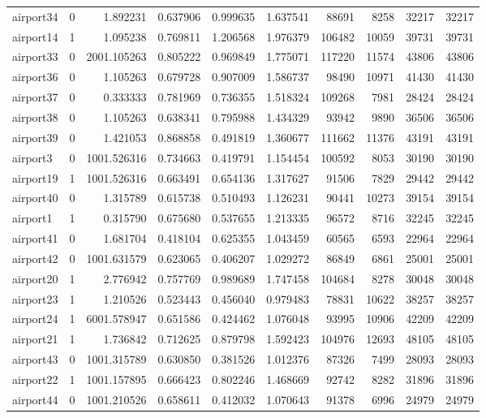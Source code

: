 \begin{longtable}{|l|r|r|r|r|r|r|r|r|r|}
airport34 & 0 & 1.892231 & 0.637906 & 0.999635 & 1.637541 & 88691 & 8258 & 32217 & 32217 \\
airport14 & 1 & 1.095238 & 0.769811 & 1.206568 & 1.976379 & 106482 & 10059 & 39731 & 39731 \\
airport33 & 0 & 2001.105263 & 0.805222 & 0.969849 & 1.775071 & 117220 & 11574 & 43806 & 43806 \\
airport36 & 0 & 1.105263 & 0.679728 & 0.907009 & 1.586737 & 98490 & 10971 & 41430 & 41430 \\
airport37 & 0 & 0.333333 & 0.781969 & 0.736355 & 1.518324 & 109268 & 7981 & 28424 & 28424 \\
airport38 & 0 & 1.105263 & 0.638341 & 0.795988 & 1.434329 & 93942 & 9890 & 36506 & 36506 \\
airport39 & 0 & 1.421053 & 0.868858 & 0.491819 & 1.360677 & 111662 & 11376 & 43191 & 43191 \\
airport3 & 0 & 1001.526316 & 0.734663 & 0.419791 & 1.154454 & 100592 & 8053 & 30190 & 30190 \\
airport19 & 1 & 1001.526316 & 0.663491 & 0.654136 & 1.317627 & 91506 & 7829 & 29442 & 29442 \\
airport40 & 0 & 1.315789 & 0.615738 & 0.510493 & 1.126231 & 90441 & 10273 & 39154 & 39154 \\
airport1 & 1 & 0.315790 & 0.675680 & 0.537655 & 1.213335 & 96572 & 8716 & 32245 & 32245 \\
airport41 & 0 & 1.681704 & 0.418104 & 0.625355 & 1.043459 & 60565 & 6593 & 22964 & 22964 \\
airport42 & 0 & 1001.631579 & 0.623065 & 0.406207 & 1.029272 & 86849 & 6861 & 25001 & 25001 \\
airport20 & 1 & 2.776942 & 0.757769 & 0.989689 & 1.747458 & 104684 & 8278 & 30048 & 30048 \\
airport23 & 1 & 1.210526 & 0.523443 & 0.456040 & 0.979483 & 78831 & 10622 & 38257 & 38257 \\
airport24 & 1 & 6001.578947 & 0.651586 & 0.424462 & 1.076048 & 93995 & 10906 & 42209 & 42209 \\
airport21 & 1 & 1.736842 & 0.712625 & 0.879798 & 1.592423 & 104976 & 12693 & 48105 & 48105 \\
airport43 & 0 & 1001.315789 & 0.630850 & 0.381526 & 1.012376 & 87326 & 7499 & 28093 & 28093 \\
airport22 & 1 & 1001.157895 & 0.666423 & 0.802246 & 1.468669 & 92742 & 8282 & 31896 & 31896 \\
airport44 & 0 & 1001.210526 & 0.658611 & 0.412032 & 1.070643 & 91378 & 6996 & 24979 & 24979 \\

\end{longtable}
